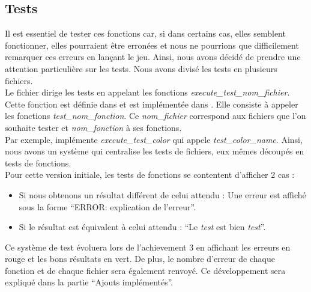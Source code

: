 \documentclass[a4paper]{article}
\begin{document}
\subsection{Tests}
Il est essentiel de tester ces fonctions car, si dans certains cas, elles semblent fonctionner, elles pourraient être erronées et nous ne pourrions que difficilement remarquer ces erreurs en lançant le jeu. Ainsi, nous avons décidé de prendre une attention particulière sur les tests. Nous avons divisé les tests en plusieurs fichiers. \\
Le fichier  dirige les tests en appelant les fonctions \emph{execute\_test\_{nom\_fichier}}. Cette fonction est définie dans  et est implémentée dans . Elle consiste à appeler les fonctions \emph{test\_{nom\_fonction}}. Ce \emph{{nom\_fichier}} correspond aux fichiers que l'on souhaite tester et \emph{{nom\_fonction}} à ses fonctions. \\
Par exemple,  implémente \emph{execute\_test\_color} qui appele \emph{test\_color\_name}. Ainsi, nous avons un système qui centralise les tests de fichiers, eux mêmes découpés en tests de fonctions. \\

Pour cette version initiale, les tests de fonctions se contentent d'afficher 2 cas :
\begin{itemize}
\item Si nous obtenons un résultat différent de celui attendu :  Une erreur est affiché sous la forme ``ERROR: explication de l'erreur''.
\item Si le résultat est équivalent à celui attendu : ``Le \emph{test} est bien \emph{test}''. \\
\end{itemize}

Ce système de test évoluera lors de l'achievement 3 en affichant les erreurs en rouge et les bons résultats en vert. De plus, le nombre d'erreur de chaque fonction et de chaque fichier sera également renvoyé. Ce développement sera expliqué dans la partie ``Ajouts implémentés''. \\
\end{document}
